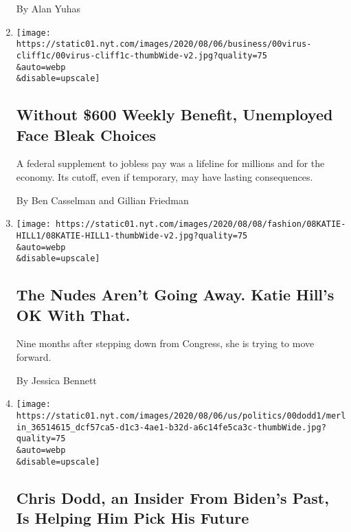 \begin{enumerate}
  By Alan Yuhas
\item
  \href{/2020/08/08/business/economy/lost-unemployment-benefits.html}{}

  \texttt{[image: https://static01.nyt.com/images/2020/08/06/business/00virus-cliff1c/00virus-cliff1c-thumbWide-v2.jpg?quality=75\\\&auto=webp\\\&disable=upscale]}

  \hypertarget{without-600-weekly-benefit-unemployed-face-bleak-choices}{%
  \subsection{Without \$600 Weekly Benefit, Unemployed Face Bleak
  Choices}\label{without-600-weekly-benefit-unemployed-face-bleak-choices}}

  A federal supplement to jobless pay was a lifeline for millions and
  for the economy. Its cutoff, even if temporary, may have lasting
  consequences.

  By Ben Casselman and Gillian Friedman
\item
  \href{/2020/08/08/style/katie-hill-she-will-rise-revenge-porn.html}{}

  \texttt{[image: https://static01.nyt.com/images/2020/08/08/fashion/08KATIE-HILL1/08KATIE-HILL1-thumbWide-v2.jpg?quality=75\\\&auto=webp\\\&disable=upscale]}

  \hypertarget{the-nudes-arent-going-away-katie-hills-ok-with-that}{%
  \subsection{The Nudes Aren't Going Away. Katie Hill's OK With
  That.}\label{the-nudes-arent-going-away-katie-hills-ok-with-that}}

  Nine months after stepping down from Congress, she is trying to move
  forward.

  By Jessica Bennett
\item
  \href{/2020/08/08/us/politics/biden-vp-chris-dodd.html}{}

  \texttt{[image: https://static01.nyt.com/images/2020/08/06/us/politics/00dodd1/merlin\_36514615\_dcf57ca5-d1c3-4ae1-b32d-a6c14fe5ca3c-thumbWide.jpg?quality=75\\\&auto=webp\\\&disable=upscale]}

  \hypertarget{chris-dodd-an-insider-from-bidens-past-is-helping-him-pick-his-future}{%
  \subsection{Chris Dodd, an Insider From Biden's Past, Is Helping Him
  Pick His
  Future}\label{chris-dodd-an-insider-from-bidens-past-is-helping-him-pick-his-future}}


\end{enumerate}
